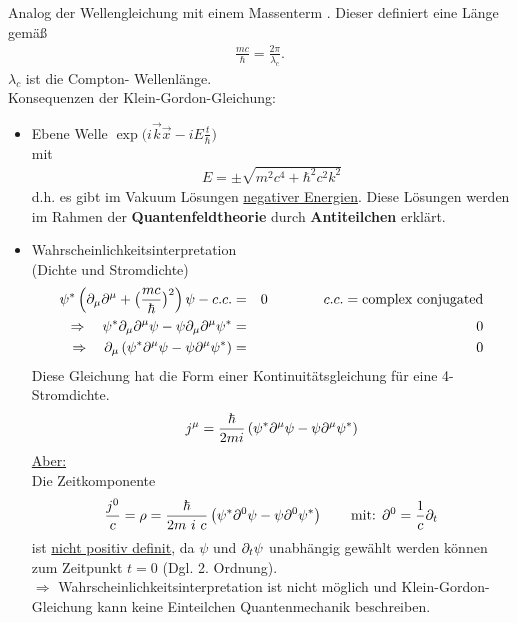 Analog der Wellengleichung mit einem Massenterm . Dieser definiert eine Länge gemäß
\begin{eqnarray*} \frac{m c}{\hbar} = \frac{2 \pi}{\lambda _c} .\end{eqnarray*}
$\lambda_c$ ist die Compton- Wellenlänge.\\
Konsequenzen der Klein-Gordon-Gleichung:
\begin{itemize}
\item Ebene Welle $\exp{\big(i\vec k \vec x -i E \frac{t }{\hbar}\big)}$\\ 
mit \begin{eqnarray*} E = \pm \sqrt{m^2c^4+ \hbar^2c ^2k^2} \end{eqnarray*}
d.h. es gibt im Vakuum Lösungen \underline{negativer Energien}. Diese Lösungen werden im Rahmen der {\bf Quantenfeldtheorie} durch {\bf Antiteilchen} erklärt.
\item Wahrscheinlichkeitsinterpretation\\
(Dichte und Stromdichte)
\begin{eqnarray*} \psi^* \left ( \partial_{\mu} \partial^{\mu} + \big (\frac{m c}{\hbar}\big )^2 \right) \psi - c.c. &=& 0 \qquad \qquad c.c. = \text{complex conjugated}\\
\Rightarrow\quad \psi ^* \partial_{\mu}\partial^{\mu} \psi - \psi \partial_{\mu}\partial^{\mu} \psi ^* &=& 0\\
\Rightarrow\quad \partial_{\mu} \left ( \psi^* \partial^{\mu} \psi - \psi \partial^{\mu} \psi^* \right ) &=& 0 \end{eqnarray*}
Diese Gleichung hat die Form einer Kontinuitätsgleichung für eine 4-Stromdichte.
\begin{eqnarray*} 
	j^{\mu} = \frac{\hbar}{2 m i}\left( \psi^* \partial^{\mu} \psi - \psi \partial^{\mu} \psi^*\right)
\end{eqnarray*}
\underline{Aber:}\\
Die Zeitkomponente 
\begin{eqnarray*} 
	\frac{j^0}c = \rho = \frac{\hbar}{2 m\ i\ c }\left(\psi^* \partial^{0} \psi- \psi \partial^{0} \psi^* \right) \qquad \text{mit: }\partial^0=\frac{1}{c}\partial_t
\end{eqnarray*} 
ist \underline{nicht positiv definit}, da $\psi$ und $\partial_t\psi$ unabhängig gewählt werden können zum Zeitpunkt $t=0$ (Dgl. 2. Ordnung).\\
$\Longrightarrow$ Wahrscheinlichkeitsinterpretation ist nicht möglich und Klein-Gordon-Gleichung kann keine Einteilchen Quantenmechanik beschreiben.


\end{itemize}
